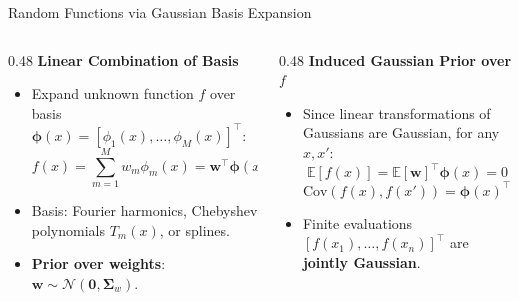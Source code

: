 \documentclass[18pt,aspectratio=149]{beamer}
\begin{document}
\begin{frame}{Random Functions via Gaussian Basis Expansion}
    \begin{columns}[T,onlytextwidth]
        \begin{column}{0.48\textwidth}
            \textbf{Linear Combination of Basis}
            \begin{itemize}
                \item Expand unknown function $f$ over basis $\boldsymbol{\phi}(x) = [\phi_1(x), \dots, \phi_M(x)]^\top$:
                \vspace{-0.3em}
                \[
                    f(x) = \sum_{m=1}^M w_m \phi_m(x) = \mathbf{w}^\top \boldsymbol{\phi}(x)
                \]
                \vspace{-0.5em}
                \item Basis: Fourier harmonics, Chebyshev polynomials $T_m(x)$, or splines.
                \item \textbf{Prior over weights}: $\mathbf{w} \sim \mathcal{N}(\mathbf{0}, \boldsymbol{\Sigma}_w)$.
            \end{itemize}
        \end{column}

        \begin{column}{0.48\textwidth}
            \textbf{Induced Gaussian Prior over $f$}
            \begin{itemize}
                \item Since linear transformations of Gaussians are Gaussian, for any $x, x'$:
                \vspace{-0.3em}
                \[
                    \mathbb{E}[f(x)] = \mathbb{E}[\mathbf{w}]^\top \boldsymbol{\phi}(x) = 0
                \]
                \vspace{-0.5em}
                \[
                    \mathrm{Cov}(f(x), f(x')) = \boldsymbol{\phi}(x)^\top \boldsymbol{\Sigma}_w \boldsymbol{\phi}(x')
                \]
                \vspace{-0.5em}
                \item Finite evaluations $[f(x_1), \dots, f(x_n)]^\top$ are \textbf{jointly Gaussian}.
            \end{itemize}
        \end{column}
    \end{columns}

\end{frame}
\end{document}
